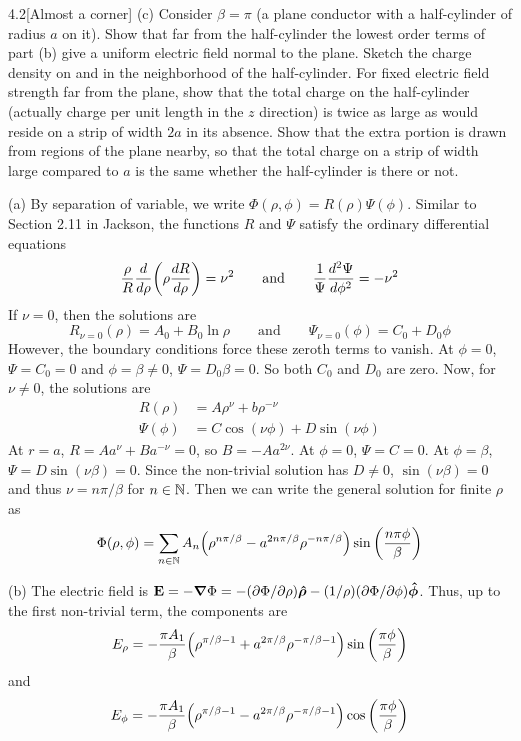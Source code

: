 \documentclass[12pt]{article}
\begin{document}
\begin{problem}{4.2}[Almost a corner]
(c) Consider $\beta=\pi$ (a plane conductor with a half-cylinder of radius $a$
on it). Show that far from the half-cylinder the lowest order terms of part (b)
give a uniform electric field normal to the plane. Sketch the charge density on
and in the neighborhood of the half-cylinder. For fixed electric field strength
far from the plane, show that the total charge on the half-cylinder (actually
charge per unit length in the $z$ direction) is twice as large as would reside
on a strip of width $2a$ in its absence. Show that the extra portion is drawn
from regions of the plane nearby, so that the total charge on a strip of width
large compared to $a$ is the same whether the half-cylinder is there or not.
\begin{solution}
(a) By separation of variable, we write $\Phi(\rho,\phi)=R(\rho)\Psi(\phi)$.
Similar to Section 2.11 in Jackson, the functions $R$ and $\Psi$ satisfy the
ordinary differential equations
\begin{equation}
    \frac{\rho}{R}\frac{d}{d\rho}\qty(\rho\frac{dR}{d\rho})=\nu^2
    \qquad\text{and}\qquad
    \frac1{\Psi}\frac{d^2\Psi}{d\phi^2}=-\nu^2
\end{equation}
If $\nu=0$, then the solutions are
\begin{equation}
    R_{\nu=0}(\rho)=A_0+B_0\ln\rho
    \qquad\text{and}\qquad
    \Psi_{\nu=0}(\phi)=C_0+D_0\phi
\end{equation}
However, the boundary conditions force these zeroth terms to vanish. At
$\phi=0$, $\Psi=C_0=0$ and $\phi=\beta\neq0$, $\Psi=D_0\beta=0$. So both $C_0$
and $D_0$ are zero. Now, for $\nu\neq 0$, the solutions are
\begin{subequations}
    \begin{align}
        R(\rho)&=A\rho^\nu+b\rho^{-\nu}\\
        \Psi(\phi)&=C\cos(\nu\phi)+D\sin(\nu\phi)
    \end{align} 
\end{subequations}
At $r=a$, $R=Aa^\nu+Ba^{-\nu}=0$, so $B=-Aa^{2\nu}$. At $\phi=0$, $\Psi=C=0$. At
$\phi=\beta$, $\Psi=D\sin(\nu\beta)=0$. Since the non-trivial solution has
$D\neq 0$, $\sin(\nu\beta)=0$ and thus $\nu=n\pi /\beta$ for $n\in\mathbb{N}$. Then we
can write the general solution for finite $\rho$ as
\begin{equation}
    \Phi(\rho,\phi)=\sum_{n\in\mathbb{N}}A_n\qty(\rho^{n\pi/\beta}-a^{2n\pi/\beta}\rho^{-n\pi/\beta})\sin\qty(\frac{n\pi\phi}{\beta}) 
\end{equation}

(b) The electric field is $\vb{E}=-\grad\Phi=-(\partial\Phi
/\partial\rho)\bm{\hat{\rho}}-(1 /\rho)(\partial\Phi /\partial\phi)\bm{\hat{\phi}}$.
Thus, up to the first non-trivial term, the components are
\begin{equation}
    E_\rho=-\frac{\pi
    A_1}{\beta}\qty(\rho^{\pi/\beta-1}+a^{2\pi/\beta}\rho^{-\pi/\beta-1})\sin\qty(\frac{\pi\phi}{\beta}) 
\end{equation}
and
\begin{equation}
    E_\phi=-\frac{\pi
    A_1}{\beta}\qty(\rho^{\pi/\beta-1}-a^{2\pi/\beta}\rho^{-\pi/\beta-1})\cos\qty(\frac{\pi\phi}{\beta}) 
\end{equation}


\end{solution}
\end{problem}
\end{document}
